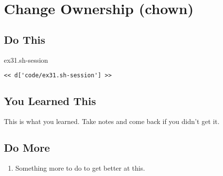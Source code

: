\chapter{Change Ownership (chown)}

\section{Do This}

\begin{code}{ex31.sh-session}
\begin{Verbatim}
<< d['code/ex31.sh-session'] >>
\end{Verbatim}
\end{code}


\section{You Learned This}

This is what you learned.  Take notes and come back if you didn't get it.

\section{Do More}

\begin{enumerate}
\item Something more to do to get better at this.
\end{enumerate}

